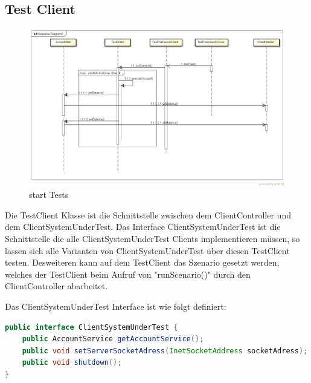 \subsection{Test Client}
\label{sec:testclient}

\begin{figure}[H]
\begin{center}
\includegraphics[scale=0.3]{image_testFramework/startTest.png}
\end{center}
\caption{start Tests}
\end{figure}

Die TestClient Klasse ist die Schnittstelle zwischen dem ClientController und dem ClientSystemUnderTest. Das Interface ClientSystemUnderTest ist die  Schnittstelle die alle ClientSystemUnderTest Clients implementieren müssen, so lassen sich alle Varianten von ClientSystemUnderTest über diesen TestClient testen. Desweiteren kann auf dem TestClient das Szenario gesetzt werden, welches der TestClient beim Aufruf von "runScenario()" durch den ClientController abarbeitet.

Das ClientSystemUnderTest Interface ist wie folgt definiert:
\begin{lstlisting}[language=java, breaklines=true] 	
public interface ClientSystemUnderTest {	
	public AccountService getAccountService();
	public void setServerSocketAdress(InetSocketAddress socketAdress);
	public void shutdown();
}	
\end{lstlisting}
